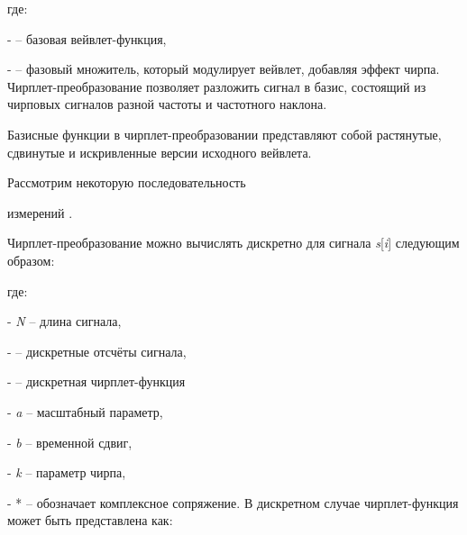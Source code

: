 где:


- 
-- базовая вейвлет-функция,

- 
-- фазовый множитель, который модулирует вейвлет, добавляя эффект
чирпа.
Чирплет-преобразование позволяет разложить сигнал в базис, состоящий из
чирповых сигналов разной частоты и частотного наклона.

Базисные функции в чирплет-преобразовании представляют собой растянутые,
сдвинутые и искривленные версии исходного вейвлета.

Рассмотрим некоторую последовательность

измерений
.

Чирплет-преобразование можно вычислять дискретно для сигнала
\emph{s}{[}\emph{i}{]} следующим образом:


где:


- \emph{N} -- длина сигнала,

- 
-- дискретные отсчёты сигнала,

- 
-- дискретная чирплет-функция

- \emph{a} -- масштабный параметр,

- \emph{b} -- временной сдвиг,

- \emph{k} -- параметр чирпа,

- * -- обозначает комплексное сопряжение.
В дискретном случае чирплет-функция может быть представлена как:


